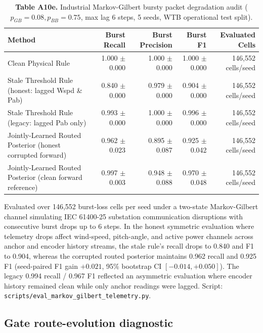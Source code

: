 \documentclass[
  journal]{IEEEtran}
\begin{document}
\begin{table}[!t]
\centering
\fontsize{8.0pt}{9.6pt}\selectfont
\setlength{\tabcolsep}{3pt}
\renewcommand{\arraystretch}{1.05}
\caption*{\textbf{Table A10e.} Industrial Markov-Gilbert bursty packet degradation audit ($p_{GB}=0.08, p_{BB}=0.75$, max lag 6 steps, 5 seeds, WTB operational test split).}
%
\begin{tabular}{lrrrr}
\toprule
Method & Burst Recall & Burst Precision & Burst F1 & Evaluated Cells \\
\midrule
Clean Physical Rule & 1.000 $\pm$ 0.000 & 1.000 $\pm$ 0.000 & 1.000 $\pm$ 0.000 & 146,552 cells/seed \\
Stale Threshold Rule (honest: lagged Wspd \& Pab) & 0.840 $\pm$ 0.000 & 0.979 $\pm$ 0.000 & 0.904 $\pm$ 0.000 & 146,552 cells/seed \\
Stale Threshold Rule (legacy: lagged Pab only) & 0.993 $\pm$ 0.000 & 1.000 $\pm$ 0.000 & 0.996 $\pm$ 0.000 & 146,552 cells/seed \\
Jointly-Learned Routed Posterior (honest corrupted forward) & 0.962 $\pm$ 0.023 & 0.895 $\pm$ 0.087 & 0.925 $\pm$ 0.042 & 146,552 cells/seed \\
Jointly-Learned Routed Posterior (clean forward reference) & 0.997 $\pm$ 0.003 & 0.948 $\pm$ 0.088 & 0.970 $\pm$ 0.048 & 146,552 cells/seed \\
\bottomrule
\end{tabular}
\vspace{1mm}
\fontsize{8.0pt}{9.6pt}\selectfont Evaluated over 146,552 burst-loss cells per seed under a two-state Markov-Gilbert channel simulating IEC 61400-25 substation communication disruptions with consecutive burst drops up to 6 steps. In the honest symmetric evaluation where telemetry drops affect wind-speed, pitch-angle, and active power channels across anchor and encoder history streams, the stale rule's recall drops to 0.840 and F1 to 0.904, whereas the corrupted routed posterior maintains 0.962 recall and 0.925 F1 (seed-paired F1 gain $+0.021$, 95\% bootstrap CI $[-0.014, +0.050]$). The legacy 0.994 recall / 0.967 F1 reflected an asymmetric evaluation where encoder history remained clean while only anchor readings were lagged. Script: \texttt{scripts/eval\_markov\_gilbert\_telemetry.py}.
\end{table}

\FloatBarrier

\subsection*{Gate route-evolution
diagnostic}\label{gate-route-evolution-diagnostic}
\end{document}
